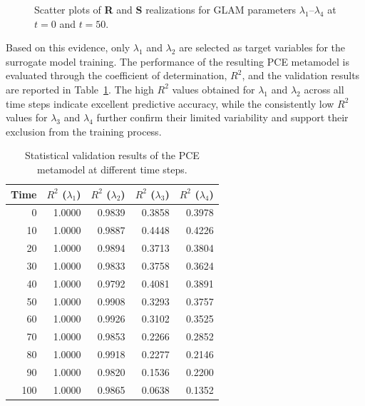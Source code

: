 \begin{figure}[H]
    \caption{Scatter plots of \textbf{R} and \textbf{S} realizations for GLAM parameters $\lambda_1$--$\lambda_4$ at $t=0$ and $t=50$.}
    \label{fig:toy_lambda_scatter_grid}
\end{figure}


Based on this evidence, only $\lambda_1$ and $\lambda_2$ are selected as target variables for the surrogate model training. The performance of the resulting PCE metamodel is evaluated through the coefficient of determination, $R^2$, and the validation results are reported in Table~\ref{tab:validation_results}. The high $R^2$ values obtained for $\lambda_1$ and $\lambda_2$ across all time steps indicate excellent predictive accuracy, while the consistently low $R^2$ values for $\lambda_3$ and $\lambda_4$ further confirm their limited variability and support their exclusion from the training process.

\begin{table}[H]
\centering
\caption{Statistical validation results of the PCE metamodel at different time steps.}
\label{tab:validation_results}
\begin{tabular}{rrrrr}
\toprule
Time & $R^2$ ($\lambda_1$) & $R^2$ ($\lambda_2$) & $R^2$ ($\lambda_3$) & $R^2$ ($\lambda_4$) \\
\midrule
0 & 1.0000 & 0.9839 & 0.3858 & 0.3978 \\
10 & 1.0000 & 0.9887 & 0.4448 & 0.4226 \\
20 & 1.0000 & 0.9894 & 0.3713 & 0.3804 \\
30 & 1.0000 & 0.9833 & 0.3758 & 0.3624 \\
40 & 1.0000 & 0.9792 & 0.4081 & 0.3891 \\
50 & 1.0000 & 0.9908 & 0.3293 & 0.3757 \\
60 & 1.0000 & 0.9926 & 0.3102 & 0.3525 \\
70 & 1.0000 & 0.9853 & 0.2266 & 0.2852 \\
80 & 1.0000 & 0.9918 & 0.2277 & 0.2146 \\
90 & 1.0000 & 0.9820 & 0.1536 & 0.2200 \\
100 & 1.0000 & 0.9865 & 0.0638 & 0.1352 \\
\bottomrule
\end{tabular}
\end{table}

